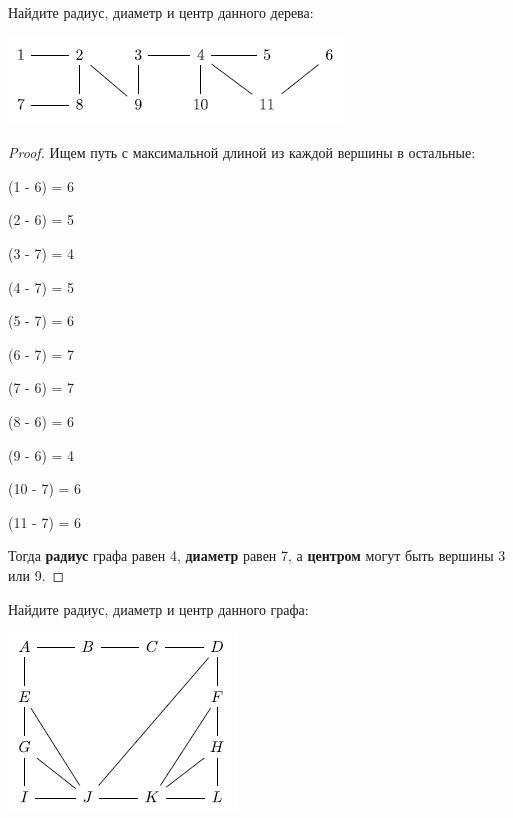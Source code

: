 \begin{problem}[9]

	Найдите радиус, диаметр и центр данного дерева:
    
    \centering\includegraphics[width=0.6\linewidth]{pics/9thGraph.png}
    
\end{problem}

\begin{proof}

    Ищем путь с максимальной длиной из каждой вершины в остальные:

    (1 - 6) = 6

    (2 - 6) = 5

    (3 - 7) = 4

    (4 - 7) = 5

    (5 - 7) = 6

    (6 - 7) = 7

    (7 - 6) = 7

    (8 - 6) = 6

    (9 - 6) = 4

    (10 - 7) = 6

    (11 - 7) = 6

    Тогда \textbf{радиус} графа равен 4, \textbf{диаметр} равен 7, а \textbf{центром} могут быть вершины 3 или 9.

\end{proof}

\begin{problem}[10]

	Найдите радиус, диаметр и центр данного графа:
    
    \centering\includegraphics[width=0.4\linewidth]{pics/10thGraph.png}
    
\end{problem}

